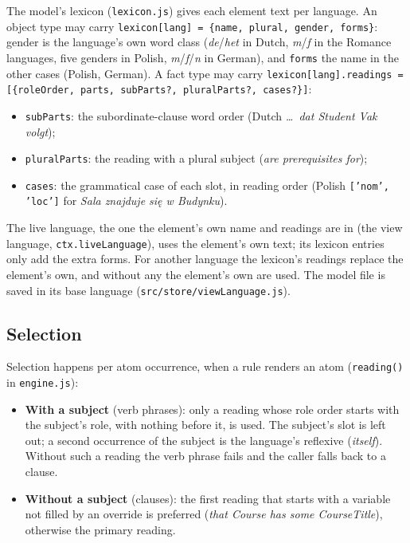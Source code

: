 \documentclass[11pt, a4paper]{article}
\newcommand{\code}[1]{\texttt{\color{codefg}#1}}
\begin{document}
The model's lexicon (\code{lexicon.js}) gives each element text per
language. An object type may carry \code{lexicon[lang] = \{name, plural,
gender, forms\}}: gender is the language's own word class (\textit{de}/\textit{het}
in Dutch, \textit{m}/\textit{f} in the Romance languages, five genders in
Polish, \textit{m}/\textit{f}/\textit{n} in German), and \code{forms} the
name in the other cases (Polish, German). A fact type may carry
\code{lexicon[lang].readings = [\{roleOrder, parts, subParts?, pluralParts?,
cases?\}]}:

\begin{itemize}
  \item \code{subParts}: the subordinate-clause word order (Dutch
        \textit{\ldots\ dat Student Vak volgt});
  \item \code{pluralParts}: the reading with a plural subject (\textit{are
        prerequisites for});
  \item \code{cases}: the grammatical case of each slot, in reading order
        (Polish \code{['nom', 'loc']} for \textit{Sala znajduje się w
        Budynku}).
\end{itemize}

The live language, the one the element's own name and readings are in (the
view language, \code{ctx.\allowbreak liveLanguage}), uses the element's own text; its
lexicon entries only add the extra forms. For another language the
lexicon's readings replace the element's own, and without any the element's
own are used. The model file is saved in its base language
(\code{src/store/viewLanguage.js}).

\subsection{Selection}

Selection happens per atom occurrence, when a rule renders an atom
(\code{reading()} in \code{engine.js}):

\begin{itemize}
  \item \textbf{With a subject} (verb phrases): only a reading whose role
        order starts with the subject's role, with nothing before it, is
        used. The subject's slot is left out; a second occurrence of the
        subject is the language's reflexive (\textit{itself}). Without such
        a reading the verb phrase fails and the caller falls back to a
        clause.
  \item \textbf{Without a subject} (clauses): the first reading that starts
        with a variable not filled by an override is preferred (\textit{that
        Course has some CourseTitle}), otherwise the primary reading.
\end{itemize}
\end{document}
